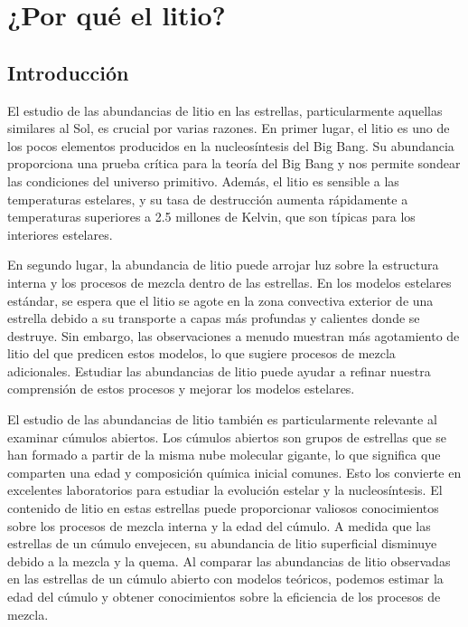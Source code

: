 
\chapter{¿Por qué el litio?}\label{ch:primer-capitulo}

\section{Introducción}
El estudio de las abundancias de litio en las estrellas, particularmente aquellas similares al Sol, es crucial por varias razones. En primer lugar, el litio es uno de los pocos elementos producidos en la nucleosíntesis del Big Bang. Su abundancia proporciona una prueba crítica para la teoría del Big Bang y nos permite sondear las condiciones del universo primitivo. Además, el litio es sensible a las temperaturas estelares, y su tasa de destrucción aumenta rápidamente a temperaturas superiores a 2.5 millones de Kelvin, que son típicas para los interiores estelares.\par

En segundo lugar, la abundancia de litio puede arrojar luz sobre la estructura interna y los procesos de mezcla dentro de las estrellas. En los modelos estelares estándar, se espera que el litio se agote en la zona convectiva exterior de una estrella debido a su transporte a capas más profundas y calientes donde se destruye. Sin embargo, las observaciones a menudo muestran más agotamiento de litio del que predicen estos modelos, lo que sugiere procesos de mezcla adicionales. Estudiar las abundancias de litio puede ayudar a refinar nuestra comprensión de estos procesos y mejorar los modelos estelares.\par

El estudio de las abundancias de litio también es particularmente relevante al examinar cúmulos abiertos. Los cúmulos abiertos son grupos de estrellas que se han formado a partir de la misma nube molecular gigante, lo que significa que comparten una edad y composición química inicial comunes. Esto los convierte en excelentes laboratorios para estudiar la evolución estelar y la nucleosíntesis. El contenido de litio en estas estrellas puede proporcionar valiosos conocimientos sobre los procesos de mezcla interna y la edad del cúmulo. A medida que las estrellas de un cúmulo envejecen, su abundancia de litio superficial disminuye debido a la mezcla y la quema. Al comparar las abundancias de litio observadas en las estrellas de un cúmulo abierto con modelos teóricos, podemos estimar la edad del cúmulo y obtener conocimientos sobre la eficiencia de los procesos de mezcla.\par

